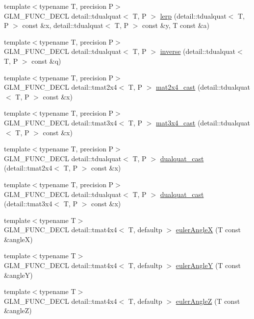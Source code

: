 \begin{CompactItemize}
{\footnotesize template$<$typename T, precision P$>$ }\\GLM\_\-FUNC\_\-DECL detail::tdualquat$<$ T, P $>$ \hyperlink{group__gtc__dual__quaternion_gfbbdf3bd28dbfe656af3d86b9c7e0cd3}{lerp} (detail::tdualquat$<$ T, P $>$ const \&x, detail::tdualquat$<$ T, P $>$ const \&y, T const \&a)
\item 
{\footnotesize template$<$typename T, precision P$>$ }\\GLM\_\-FUNC\_\-DECL detail::tdualquat$<$ T, P $>$ \hyperlink{group__gtc__dual__quaternion_g793733e8cc7644ec2ff32a1007e85282}{inverse} (detail::tdualquat$<$ T, P $>$ const \&q)
\item 
{\footnotesize template$<$typename T, precision P$>$ }\\GLM\_\-FUNC\_\-DECL detail::tmat2x4$<$ T, P $>$ \hyperlink{group__gtc__dual__quaternion_g5dbb18f30b7a8d6646efd9e765e04535}{mat2x4\_\-cast} (detail::tdualquat$<$ T, P $>$ const \&x)
\item 
{\footnotesize template$<$typename T, precision P$>$ }\\GLM\_\-FUNC\_\-DECL detail::tmat3x4$<$ T, P $>$ \hyperlink{group__gtc__dual__quaternion_gbd9f9dad6fbec2e89d5b239b8dc37096}{mat3x4\_\-cast} (detail::tdualquat$<$ T, P $>$ const \&x)
\item 
{\footnotesize template$<$typename T, precision P$>$ }\\GLM\_\-FUNC\_\-DECL detail::tdualquat$<$ T, P $>$ \hyperlink{group__gtc__dual__quaternion_gacea24f869d7e991fafcee55641595ec}{dualquat\_\-cast} (detail::tmat2x4$<$ T, P $>$ const \&x)
\item 
{\footnotesize template$<$typename T, precision P$>$ }\\GLM\_\-FUNC\_\-DECL detail::tdualquat$<$ T, P $>$ \hyperlink{group__gtc__dual__quaternion_ge10828b8a3ab80fa7e9e429ebaefb9e0}{dualquat\_\-cast} (detail::tmat3x4$<$ T, P $>$ const \&x)
\item 
{\footnotesize template$<$typename T$>$ }\\GLM\_\-FUNC\_\-DECL detail::tmat4x4$<$ T, defaultp $>$ \hyperlink{group__gtx__euler__angles_g5fb8269b6795f95dec7ca7bbe61805f6}{eulerAngleX} (T const \&angleX)
\item 
{\footnotesize template$<$typename T$>$ }\\GLM\_\-FUNC\_\-DECL detail::tmat4x4$<$ T, defaultp $>$ \hyperlink{group__gtx__euler__angles_g558b0e0fd3c1f6a414d184a22c968b79}{eulerAngleY} (T const \&angleY)
\item 
{\footnotesize template$<$typename T$>$ }\\GLM\_\-FUNC\_\-DECL detail::tmat4x4$<$ T, defaultp $>$ \hyperlink{group__gtx__euler__angles_ge77e2c08c118ecd34ffc8ca425d2cf77}{eulerAngleZ} (T const \&angleZ)

\end{CompactItemize}
